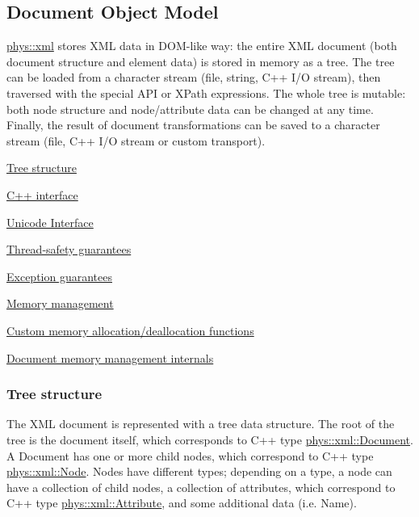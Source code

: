 \par
 \par
 \hypertarget{XMLManual_XMLDOM}{}\subsection{Document Object Model}\label{XMLManual_XMLDOM}
\hyperlink{namespacephys_1_1xml}{phys::xml} stores XML data in DOM-\/like way: the entire XML document (both document structure and element data) is stored in memory as a tree. The tree can be loaded from a character stream (file, string, C++ I/O stream), then traversed with the special API or XPath expressions. The whole tree is mutable: both node structure and node/attribute data can be changed at any time. Finally, the result of document transformations can be saved to a character stream (file, C++ I/O stream or custom transport).
\begin{DoxyItemize}
\item \hyperlink{XMLManual_XMLTreeStructure}{Tree structure}
\item \hyperlink{XMLManual_XMLInterface}{C++ interface}
\item \hyperlink{XMLManual_XMLUnicode}{Unicode Interface}
\item \hyperlink{XMLManual_XMLThreadSafety}{Thread-\/safety guarantees}
\item \hyperlink{XMLManual_XMLExceptionSafety}{Exception guarantees}
\item \hyperlink{XMLManual_XMLMemory}{Memory management}
\begin{DoxyItemize}
\item \hyperlink{XMLManual_XMLCustomAlloc}{Custom memory allocation/deallocation functions}
\item \hyperlink{XMLManual_XMLMemoryInternals}{Document memory management internals}
\end{DoxyItemize}
\end{DoxyItemize}\hypertarget{XMLManual_XMLTreeStructure}{}\subsubsection{Tree structure}\label{XMLManual_XMLTreeStructure}
The XML document is represented with a tree data structure. The root of the tree is the document itself, which corresponds to C++ type \hyperlink{classphys_1_1xml_1_1Document}{phys::xml::Document}. A Document has one or more child nodes, which correspond to C++ type \hyperlink{classphys_1_1xml_1_1Node}{phys::xml::Node}. Nodes have different types; depending on a type, a node can have a collection of child nodes, a collection of attributes, which correspond to C++ type \hyperlink{classphys_1_1xml_1_1Attribute}{phys::xml::Attribute}, and some additional data (i.e. Name). \par
